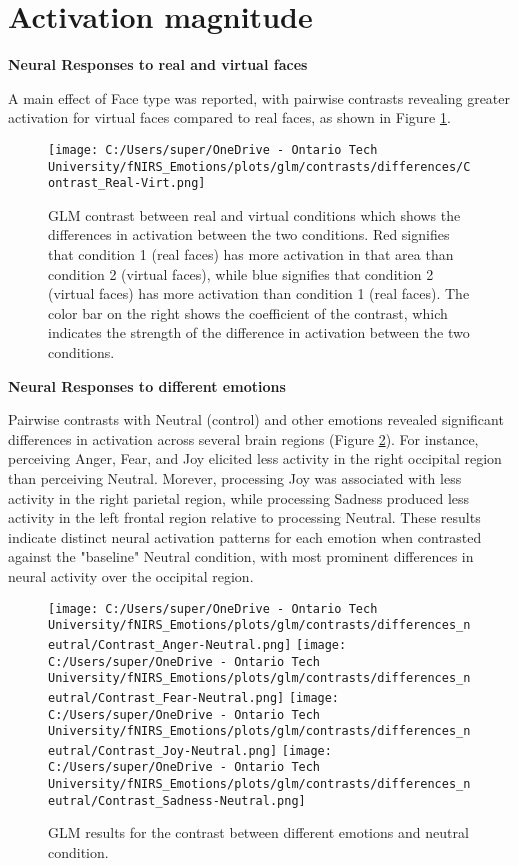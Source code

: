 \section{Activation magnitude}
\noindent
\textbf{Neural Responses to real and virtual faces}

A main effect of Face type was reported, with pairwise contrasts revealing greater activation for virtual faces compared to real faces, as shown in Figure \ref{fig:glm_real_vs_virtual}.
\begin{figure}[H]
    \centering
      \texttt{[image: C:/Users/super/OneDrive - Ontario Tech University/fNIRS\_Emotions/plots/glm/contrasts/differences/Contrast\_Real-Virt.png]}
      \caption[GLM: Real vs. Virtual Faces]{GLM contrast between real and virtual conditions which shows the differences in activation between the two conditions.
      Red signifies that condition 1 (real faces) has more activation in that area than condition 2 (virtual faces), while blue signifies that condition 2 (virtual faces) has more activation than condition 1 (real faces).
      The color bar on the right shows the coefficient of the contrast, which indicates the strength of the difference in activation between the two conditions.}
      \label{fig:glm_real_vs_virtual}
\end{figure}

\noindent
\textbf{Neural Responses to different emotions}

Pairwise contrasts with Neutral (control) and other emotions revealed significant differences in activation across several brain regions (Figure \ref{fig:glm_emotion_analysis_neutral}). 
For instance, perceiving Anger, Fear, and Joy elicited less activity in the right occipital region than perceiving Neutral. 
Morever, processing Joy was associated with less activity in the right parietal region, while processing Sadness produced less activity in the left frontal region relative to processing Neutral. 
These results indicate distinct neural activation patterns for each emotion when contrasted against the "baseline" Neutral condition, with most prominent differences in neural activity over the occipital region. 

\begin{figure}[H]
    \centering
    \texttt{[image: C:/Users/super/OneDrive - Ontario Tech University/fNIRS\_Emotions/plots/glm/contrasts/differences\_neutral/Contrast\_Anger-Neutral.png]}
    \texttt{[image: C:/Users/super/OneDrive - Ontario Tech University/fNIRS\_Emotions/plots/glm/contrasts/differences\_neutral/Contrast\_Fear-Neutral.png]}
    \texttt{[image: C:/Users/super/OneDrive - Ontario Tech University/fNIRS\_Emotions/plots/glm/contrasts/differences\_neutral/Contrast\_Joy-Neutral.png]}
    \texttt{[image: C:/Users/super/OneDrive - Ontario Tech University/fNIRS\_Emotions/plots/glm/contrasts/differences\_neutral/Contrast\_Sadness-Neutral.png]}
    \caption[GLM: Emotion vs. Neutral]{GLM results for the contrast between different emotions and neutral condition.}
    \label{fig:glm_emotion_analysis_neutral}
\end{figure}

